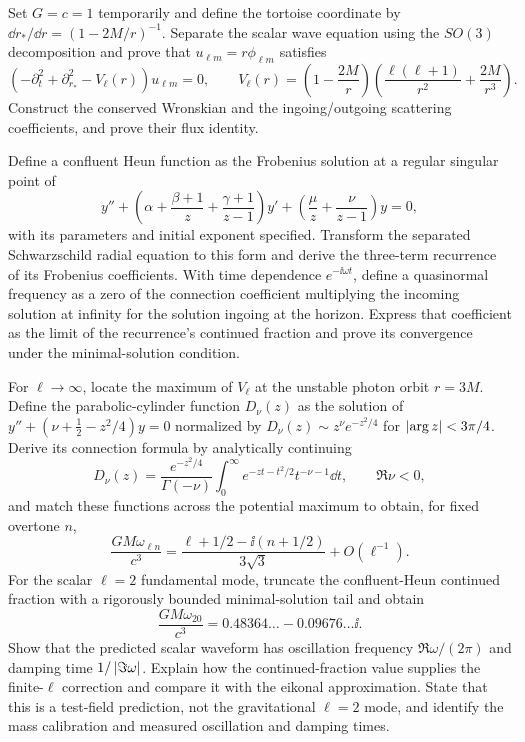 \begin{exercise}
Set $G=c=1$ temporarily and define the tortoise coordinate by
$\dd r_*/\dd r=(1-2M/r)^{-1}$.  Separate the scalar wave equation using the
$SO(3)$ decomposition and prove that $u_{\ell m}=r\phi_{\ell m}$ satisfies
\[
 \left(-\partial_t^2+\partial_{r_*}^2-V_\ell(r)\right)u_{\ell m}=0,
 \qquad
 V_\ell(r)=\left(1-\frac{2M}{r}\right)
 \left(\frac{\ell(\ell+1)}{r^2}+\frac{2M}{r^3}\right).
\]
Construct the conserved Wronskian and the ingoing/outgoing scattering
coefficients, and prove their flux identity.
\end{exercise}

\begin{exercise}
Define a confluent Heun function as the Frobenius solution at a regular
singular point of
\[
 y''+\left(\alpha+\frac{\beta+1}{z}+\frac{\gamma+1}{z-1}\right)y'
 +\left(\frac\mu z+\frac\nu{z-1}\right)y=0,
\]
with its parameters and initial exponent specified.  Transform the separated
Schwarzschild radial equation to this form and derive the three-term
recurrence of its Frobenius coefficients.  With time dependence
$e^{-\ii\omega t}$, define a quasinormal frequency as a zero of the
connection coefficient multiplying the incoming solution at
infinity for the solution ingoing at the horizon.  Express that coefficient
as the limit of the recurrence's continued fraction and prove its convergence
under the minimal-solution condition.
\end{exercise}

\begin{exercise}
For $\ell\to\infty$, locate the maximum of $V_\ell$ at the unstable photon
orbit $r=3M$.  Define the parabolic-cylinder function $D_\nu(z)$ as the
solution of $y''+(\nu+\tfrac12-z^2/4)y=0$ normalized by
$D_\nu(z)\sim z^\nu e^{-z^2/4}$ for $\left\lvert \arg z\right\rvert<3\pi/4$.  Derive its
connection formula by analytically continuing
\[
 D_\nu(z)=\frac{e^{-z^2/4}}{\Gamma(-\nu)}
 \int_0^\infty e^{-zt-t^2/2}t^{-\nu-1}\dd t,
 \qquad \Re\nu<0,
\]
and match these functions
across the potential maximum to obtain, for fixed overtone $n$,
\[
 \frac{GM\omega_{\ell n}}{c^3}=
 \frac{\ell+1/2-\ii(n+1/2)}{3\sqrt3}+O(\ell^{-1}).
\]
For the scalar $\ell=2$ fundamental mode, truncate the confluent-Heun
continued fraction with a rigorously bounded minimal-solution tail and obtain
\[
 \frac{GM\omega_{20}}{c^3}
 =0.48364\ldots-0.09676\ldots\ii.
\]
Show that the predicted scalar waveform has oscillation frequency
$\Re\omega/(2\pi)$ and damping time $1/\left\lvert \Im\omega\right\rvert$.  Explain how the
continued-fraction value supplies the finite-$\ell$ correction and compare it
with the eikonal approximation.  State that this is a test-field prediction,
not the gravitational $\ell=2$ mode, and identify the mass calibration and
measured oscillation and damping times.
\end{exercise}

